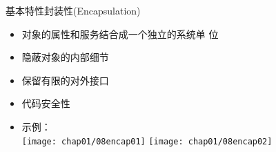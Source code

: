 \begin{frame}{基本特性}{封装性(Encapsulation)}
  \stretchon
  \begin{itemize}
  \item 对象的\alert{属性}和\alert{服务}结合成一个\alert{独立的系统单
      位}
  \item 隐蔽对象的\alert{内部细节}
  \item 保留有限的\alert{对外接口}
  \item \alert{代码安全性}
  \item 示例：\\
    \centering
    \texttt{[image: chap01/08encap01]}\qquad%
    \texttt{[image: chap01/08encap02]}
  \end{itemize}
  \stretchoff
\end{frame}


